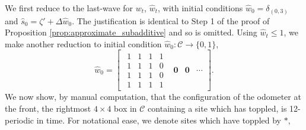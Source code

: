 \documentclass[12pt]{amsart}
\begin{document}
We first reduce to the last-wave for $w_t$, $\hat{w}_t$, with initial conditions
$\hat{w}_0 = \delta_{(0,3)}$ and
$\hat{s}_0 = \zeta' + \Delta \hat{w}_0$. The justification is identical to Step 1 of the proof of Proposition \ref{prop:approximate_subadditive}
and so is omitted.  Using $\hat{w}_t \leq 1$, we make another reduction to initial condition
$\hat{w}_0: \mathcal{C} \to \{0, 1\}$, 
\[
\hat{w}_0 = 
\begin{bmatrix} 
\begin{smallmatrix}
1 & 1 & 1 & 1 \\
1 & 1 & 1 & 0 \\
1 & 1 & 1 & 0 \\
1 & 1 & 1 & 1 
\end{smallmatrix}
& \mathbf{0} & \mathbf{0} & \cdots
\end{bmatrix}.
\]
\setcounter{MaxMatrixCols}{50}
We now show, by manual computation, that the configuration of the odometer at the front, the rightmost $4 \times 4$ box in $\mathcal{C}$ containing a site which has toppled, 
is 12-periodic in time. For notational ease, we denote sites which have toppled by $*$, 
\end{document}
